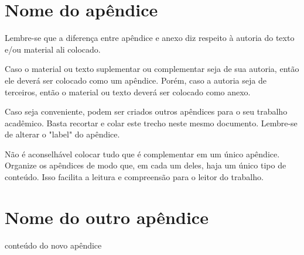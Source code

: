 
\begin{apendicesenv}
\partapendices

\chapter{Nome do apêndice} %
\label{chap:apendiceA}

Lembre-se que a diferença entre apêndice e anexo diz respeito à autoria do texto e/ou material ali colocado.

Caso o material ou texto suplementar ou complementar seja de sua autoria, então ele deverá ser colocado como um apêndice. Porém, caso a autoria seja de terceiros, então o material ou texto deverá ser colocado como anexo.

Caso seja conveniente, podem ser criados outros apêndices para o seu trabalho acadêmico. Basta recortar e colar este trecho neste mesmo documento. Lembre-se de alterar o "label"{} do apêndice.

Não é aconselhável colocar tudo que é complementar em um único apêndice. Organize os apêndices de modo que, em cada um deles, haja um único tipo de conteúdo. Isso facilita a leitura e compreensão para o leitor do trabalho. 

\chapter{Nome do outro apêndice}
\label{chap:apendiceB}

conteúdo do novo apêndice

\end{apendicesenv}
